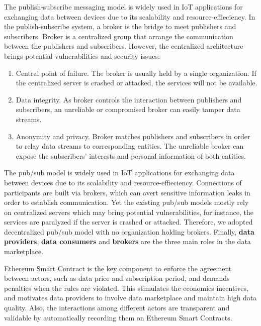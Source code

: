 The publish-subscribe messaging model is widely used in IoT applications for exchanging data between devices due to its scalability and resource-effieciency. In the publish-subscribe system, a broker is the bridge to meet publishers and subscribers. Broker is a centralized group that arrange the communication between the publishers and subscribers. However, the centralized architecture brings potential vulnerabilities and security issues:

\begin{enumerate}
	\item Central point of failure. 
	The broker is usually held by a single organization. If the centralized server is crashed or attacked, the services will not be available. 	
	\item Data integrity.
	As broker controls the interaction between publishers and subscribers, an unreliable or compromised broker can easily tamper data streams. 
	\item Anonymity and privacy.
	Broker matches publishers and subscribers in order to relay data streams to corresponding entities. The unreliable broker can expose the subscribers' interests and personal information of both entities.  
\end{enumerate}

The pub/sub model is widely used in IoT applications for exchanging data between devices due to its scalability and resource-effieciency. Connections of participants are built via brokers, which can avert sensitive information leaks in order to establish communication. Yet the existing pub/sub models\cite{MQTT, Looci, centralPubSub} mostly rely on centralized servers which may bring potential vulnerabilities, for instance, the services are paralyzed if the server is crashed or attacked. Therefore, we adopted decentralized pub/sub model with no organization holding brokers. Finally, \textbf{data providers}, \textbf{data consumers} and \textbf{brokers} are the three main roles in the data marketplace.

Ethereum Smart Contract is the key component to enforce the agreement between actors, such as data price and subscription period, and demands penalties when the rules are violated. This stimulates the economics incentives, and motivates data providers to involve data marketplace and maintain high data quality. Also, the interactions among different actors are transparent and validable by automatically recording them on Ethereum Smart Contracts. 

